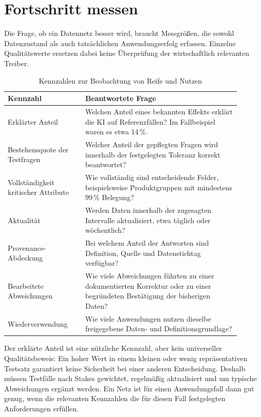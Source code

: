 \documentclass[a4paper,12pt]{article}
\theoremstyle{definition}
\begin{document}
\FloatBarrier

\section{Fortschritt messen}
\label{sec:metrics}

Die Frage, ob ein Datennetz besser wird, braucht Messgrößen, die sowohl Datenzustand als auch tatsächlichen Anwendungserfolg erfassen. Einzelne Qualitätswerte ersetzen dabei keine Überprüfung der wirtschaftlich relevanten Treiber.

\begin{table}[htbp]
\centering
\small
\caption{Kennzahlen zur Beobachtung von Reife und Nutzen}
\label{tab:metrics}
\begin{tabular}{p{0.30\linewidth}p{0.60\linewidth}}
\toprule
\textbf{Kennzahl} & \textbf{Beantwortete Frage} \\
\midrule
Erklärter Anteil & Welchen Anteil eines bekannten Effekts erklärt die KI auf Referenzfällen? Im Fallbeispiel waren es etwa 14\,\%. \\
Bestehensquote der Testfragen & Welcher Anteil der gepflegten Fragen wird innerhalb der festgelegten Toleranz korrekt beantwortet? \\
Vollständigkeit kritischer Attribute & Wie vollständig sind entscheidende Felder, beispielsweise Produktgruppen mit mindestens 99\,\% Belegung? \\
Aktualität & Werden Daten innerhalb der zugesagten Intervalle aktualisiert, etwa täglich oder wöchentlich? \\
Provenance-Abdeckung & Bei welchem Anteil der Antworten sind Definition, Quelle und Datenstichtag verfügbar? \\
Bearbeitete Abweichungen & Wie viele Abweichungen führten zu einer dokumentierten Korrektur oder zu einer begründeten Bestätigung der bisherigen Daten? \\
Wiederverwendung & Wie viele Anwendungen nutzen dieselbe freigegebene Daten- und Definitionsgrundlage? \\
\bottomrule
\end{tabular}
\end{table}

Der erklärte Anteil ist eine nützliche Kennzahl, aber kein universeller Qualitätsbeweis: Ein hoher Wert in einem kleinen oder wenig repräsentativen Testsatz garantiert keine Sicherheit bei einer anderen Entscheidung. Deshalb müssen Testfälle nach Stakes gewichtet, regelmäßig aktualisiert und um typische Abweichungen ergänzt werden. Ein Netz ist für einen Anwendungsfall dann gut genug, wenn die relevanten Kennzahlen die für diesen Fall festgelegten Anforderungen erfüllen.
\end{document}
